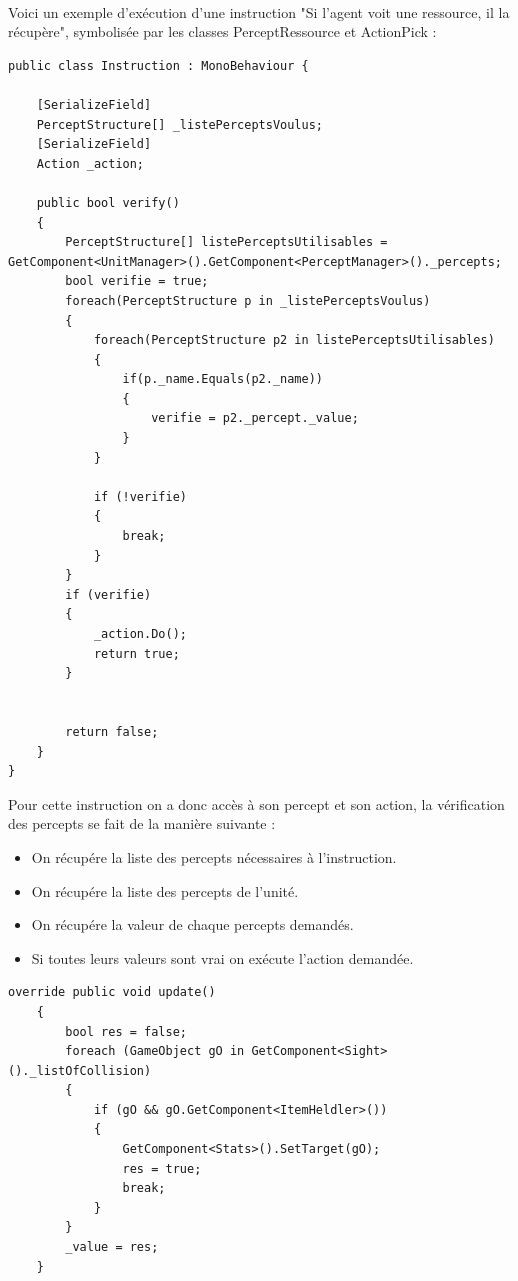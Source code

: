\documentclass{report}
\begin{document}
\paragraph{}Voici un exemple d'exécution d'une instruction "Si l'agent voit une ressource, il la récupère", symbolisée par les classes PerceptRessource et ActionPick :
\begin{lstlisting}[language={[Sharp]C},label={lst:unitScript}, caption=  Classe Instruction du fichier Instruction.cs première version.]
public class Instruction : MonoBehaviour {

    [SerializeField]
    PerceptStructure[] _listePerceptsVoulus;
    [SerializeField]
    Action _action;

    public bool verify()
    {
        PerceptStructure[] listePerceptsUtilisables = GetComponent<UnitManager>().GetComponent<PerceptManager>()._percepts;
        bool verifie = true;
        foreach(PerceptStructure p in _listePerceptsVoulus)
        {
            foreach(PerceptStructure p2 in listePerceptsUtilisables)
            {
                if(p._name.Equals(p2._name))
                {
                    verifie = p2._percept._value;
                }
            }

            if (!verifie)
            {
                break;
            }
        }
        if (verifie)
        {
            _action.Do();
            return true;
        }


        return false;
    }
}
\end{lstlisting}
Pour cette instruction on a donc accès à son percept et son action, la vérification des percepts se fait de la manière suivante :
\begin{itemize}
\item On récupére la liste des percepts nécessaires à l'instruction.
\item On récupére la liste des percepts de l'unité.
\item On récupére la valeur de chaque percepts demandés.
\item Si toutes leurs valeurs sont vrai on exécute l'action demandée.
\end{itemize}
\begin{lstlisting}[language={[Sharp]C},label={lst:unitScript}, caption=  Extrait du code du script PerceptRessource.cs première version.]
    override public void update()
    {
        bool res = false;
        foreach (GameObject gO in GetComponent<Sight>()._listOfCollision)
        {
            if (gO && gO.GetComponent<ItemHeldler>())
            {
                GetComponent<Stats>().SetTarget(gO);
                res = true;
                break;
            }
        }
        _value = res;
    }
\end{lstlisting}
\end{document}
